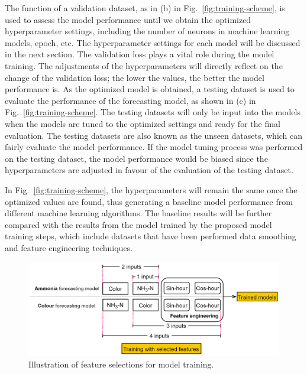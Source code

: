 The function of a validation dataset, as in (b) in Fig.~\ref{fig:training-scheme}, is used to assess the model performance until we obtain the optimized hyperparameter settings, including the number of neurons in machine learning models, epoch, etc. The hyperparameter settings for each model will be discussed in the next section. The validation loss plays a vital role during the model training. The adjustments of the hyperparameters will directly reflect on the change of the validation loss; the lower the values, the better the model performance is. As the optimized model is obtained, a testing dataset is used to evaluate the performance of the forecasting model, as shown in (c) in Fig.~\ref{fig:training-scheme}. The testing datasets will only be input into the models when the models are tuned to the optimized settings and ready for the final evaluation. The testing datasets are also known as the unseen datasets, which can fairly evaluate the model performance. If the model tuning process was performed on the testing dataset, the model performance would be biased since the hyperparameters are adjusted in favour of the evaluation of the testing dataset.

In Fig.~\ref{fig:training-scheme}, the hyperparameters will remain the same once the optimized values are found, thus generating a baseline model performance from different machine learning algorithms. The baseline results will be further compared with the results from the model trained by the proposed model training steps, which include datasets that have been performed data smoothing and feature engineering techniques.

\begin{figure}[!ht]
    \centering
    \includegraphics[width=1.0\columnwidth]{imgs/pre-processing/feature-selection.png}
    \caption{Illustration of feature selections for model training.}
    \label{fig:feature-selection}
 \end{figure}

